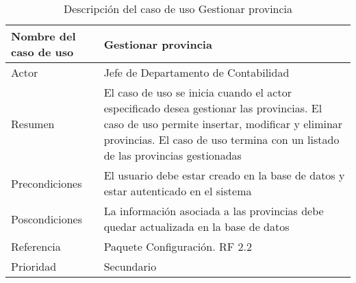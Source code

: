 \begin{table}[H]
	\sf
	\begin{supertabular}{|p{4.5cm}|p{12cm}|}
		\hline
		\textbf{Nombre del caso de uso}
		& \textbf{Gestionar provincia} \\ \hline
		
		Actor
		& Jefe de Departamento de Contabilidad \\ \hline
		
		Resumen
		& El caso de uso se inicia cuando el actor especificado desea gestionar las provincias. El caso de uso permite insertar, modificar y eliminar provincias. El caso de uso termina con un listado de las provincias gestionadas \\ \hline
		
		Precondiciones
		& El usuario debe estar creado en la base de datos y estar autenticado en el sistema \\ \hline
		
		Poscondiciones
		& La información asociada a las provincias debe quedar actualizada en la base de datos \\ \hline
		
		Referencia
		& Paquete Configuración. RF 2.2 \\ \hline
		
		Prioridad
		& Secundario \\		
		\hline
	\end{supertabular}
	\caption[Descripción del caso de uso Gestionar provincia]{Descripción del caso de uso Gestionar provincia}
	\label{table:CU_GestProv}
\end{table}

